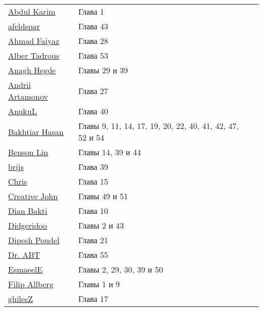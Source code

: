 \vspace{\baselineskip}
\begin{tabular}{p{}ll}
\href{https://stackoverflow.com/users/5108673/}{\underline{Abdul Karim}} & Глава 1 \\
\href{https://stackoverflow.com/users/33904/}{\underline{afeldspar}} & Глава 43 \\
\href{https://stackoverflow.com/users/1890199/}{\underline{Ahmad Faiyaz}} & Глава 28 \\
\href{https://stackoverflow.com/users/7310948/}{\underline{Alber Tadrous}} & Глава 53 \\
\href{https://stackoverflow.com/users/6181189/}{\underline{Anagh Hegde}} & Главы 29 и 39 \\
\href{https://stackoverflow.com/users/5339154/}{\underline{Andrii Artamonov}} & Глава 27 \\
\href{https://stackoverflow.com/users/2795050/}{\underline{AnukuL}} & Глава 40 \\
\href{https://stackoverflow.com/users/6879340/}{\underline{Bakhtiar Hasan}} & Главы 9, 11, 14, 17, 19, 20, 22, 40, 41, 42, 47, 52 и 54 \\
\href{https://stackoverflow.com/users/6800367/}{\underline{Benson Lin}} & Главы 14, 39 и 44 \\
\href{https://stackoverflow.com/users/5304035/}{\underline{brijs}} & Глава 39 \\
\href{https://stackoverflow.com/users/2341336/}{\underline{Chris}} & Глава 15 \\
\href{https://stackoverflow.com/users/5065086/}{\underline{Creative John}} & Главы 49 и 51 \\
\href{https://stackoverflow.com/users/7003027/}{\underline{Dian Bakti}} & Глава 10 \\
\href{https://stackoverflow.com/users/1307725/}{\underline{Didgeridoo}} & Главы 2 и 43 \\
\href{https://stackoverflow.com/users/5309397/}{\underline{Dipesh Poudel}} & Глава 21 \\
\href{https://stackoverflow.com/users/303612/}{\underline{Dr. ABT}} & Глава 55 \\
\href{https://stackoverflow.com/users/7508077/}{\underline{EsmaeelE}} & Главы 2, 29, 30, 39 и 50 \\
\href{https://stackoverflow.com/users/5045375/}{\underline{Filip Allberg}} & Главы 1 и 9 \\
\href{https://stackoverflow.com/users/7214292/}{\underline{ghilesZ}} & Глава 17 \\

\end{tabular}
